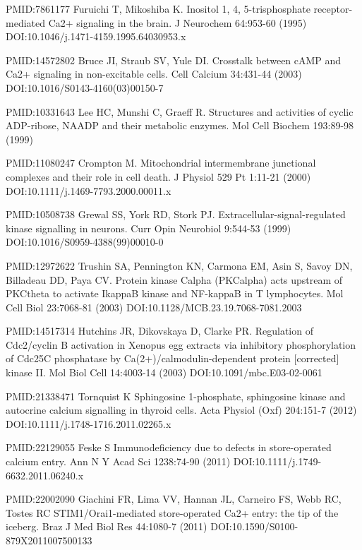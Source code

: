 \begin{thebibliography}{00}
PMID:7861177
 Furuichi T, Mikoshiba K.
\newblock Inositol 1, 4, 5-trisphosphate receptor-mediated Ca2+ signaling in the brain.
\newblock J Neurochem 64:953-60 (1995) DOI:10.1046/j.1471-4159.1995.64030953.x

PMID:14572802
 Bruce JI, Straub SV, Yule DI.
\newblock Crosstalk between cAMP and Ca2+ signaling in non-excitable cells.
\newblock Cell Calcium 34:431-44 (2003) DOI:10.1016/S0143-4160(03)00150-7

PMID:10331643
 Lee HC, Munshi C, Graeff R.
\newblock Structures and activities of cyclic ADP-ribose, NAADP and their metabolic enzymes.
\newblock Mol Cell Biochem 193:89-98 (1999)

PMID:11080247
 Crompton M.
\newblock Mitochondrial intermembrane junctional complexes and their role in cell death.
\newblock J Physiol 529 Pt 1:11-21 (2000) DOI:10.1111/j.1469-7793.2000.00011.x

PMID:10508738
 Grewal SS, York RD, Stork PJ.
\newblock Extracellular-signal-regulated kinase signalling in neurons.
\newblock Curr Opin Neurobiol 9:544-53 (1999) DOI:10.1016/S0959-4388(99)00010-0

PMID:12972622
 Trushin SA, Pennington KN, Carmona EM, Asin S, Savoy DN, Billadeau DD, Paya CV.
\newblock Protein kinase Calpha (PKCalpha) acts upstream of PKCtheta to activate IkappaB kinase and NF-kappaB in T lymphocytes.
\newblock Mol Cell Biol 23:7068-81 (2003) DOI:10.1128/MCB.23.19.7068-7081.2003

PMID:14517314
 	Hutchins JR, Dikovskaya D, Clarke PR.
\newblock Regulation of Cdc2/cyclin B activation in Xenopus egg extracts via inhibitory phosphorylation of Cdc25C phosphatase by Ca(2+)/calmodulin-dependent protein [corrected] kinase II.
\newblock Mol Biol Cell 14:4003-14 (2003) DOI:10.1091/mbc.E03-02-0061

PMID:21338471
 Tornquist K
\newblock Sphingosine 1-phosphate, sphingosine kinase and autocrine calcium signalling in thyroid cells.
\newblock Acta Physiol (Oxf) 204:151-7 (2012) DOI:10.1111/j.1748-1716.2011.02265.x

PMID:22129055
 Feske S
\newblock Immunodeficiency due to defects in store-operated calcium entry.
\newblock Ann N Y Acad Sci 1238:74-90 (2011) DOI:10.1111/j.1749-6632.2011.06240.x

PMID:22002090
 Giachini FR, Lima VV, Hannan JL, Carneiro FS, Webb RC, Tostes RC
\newblock STIM1/Orai1-mediated store-operated Ca2+ entry: the tip of the iceberg.
\newblock Braz J Med Biol Res 44:1080-7 (2011) DOI:10.1590/S0100-879X2011007500133


\end{thebibliography}
